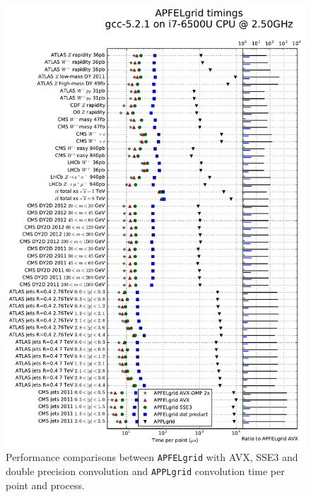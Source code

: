 \documentclass[preprint,12pt]{elsarticle}
\begin{document}
\begin{figure}[ph]
  \centering
  \includegraphics[scale=0.5]{plots/t0a}
\caption{\small Performance comparisons between {\tt APFELgrid} with
  AVX, SSE3 and double precision convolution and {\tt APPLgrid}
  convolution time per point and process.}
\label{fig:benchmark}
\end{figure}
\end{document}
